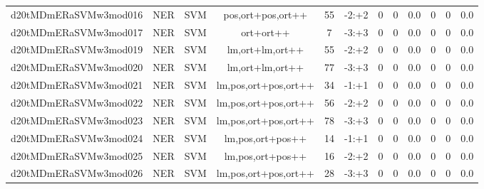 \documentclass[a4paper]{article}
\begin{document}
\begin{landscape}
\begin{center}
\begin{tabular}{ |c|c|c|c|c|c|c|c|c|c|c|c|}
 
 	
 	\small{ d20tMDmERaSVMw3mod016 } & \small{ NER} & \small{  SVM }  & pos,ort+pos,ort++  &  55 &  \small{  -2:+2 }  &  0 & 0 & 0.0  &  0 & 0 & 0.0 \\
 	

 
 	
 	\small{ d20tMDmERaSVMw3mod017 } & \small{ NER} & \small{  SVM }  & ort+ort++  &  7 &  \small{  -3:+3 }  &  0 & 0 & 0.0  &  0 & 0 & 0.0 \\
 	

 
 	
 	\small{ d20tMDmERaSVMw3mod019 } & \small{ NER} & \small{  SVM }  & lm,ort+lm,ort++  &  55 &  \small{  -2:+2 }  &  0 & 0 & 0.0  &  0 & 0 & 0.0 \\
 	

 
 	
 	\small{ d20tMDmERaSVMw3mod020 } & \small{ NER} & \small{  SVM }  & lm,ort+lm,ort++  &  77 &  \small{  -3:+3 }  &  0 & 0 & 0.0  &  0 & 0 & 0.0 \\
 	

 
 	
 	\small{ d20tMDmERaSVMw3mod021 } & \small{ NER} & \small{  SVM }  & lm,pos,ort+pos,ort++  &  34 &  \small{  -1:+1 }  &  0 & 0 & 0.0  &  0 & 0 & 0.0 \\
 	

 
 	
 	\small{ d20tMDmERaSVMw3mod022 } & \small{ NER} & \small{  SVM }  & lm,pos,ort+pos,ort++  &  56 &  \small{  -2:+2 }  &  0 & 0 & 0.0  &  0 & 0 & 0.0 \\
 	

 
 	
 	\small{ d20tMDmERaSVMw3mod023 } & \small{ NER} & \small{  SVM }  & lm,pos,ort+pos,ort++  &  78 &  \small{  -3:+3 }  &  0 & 0 & 0.0  &  0 & 0 & 0.0 \\
 	

 
 	
 	\small{ d20tMDmERaSVMw3mod024 } & \small{ NER} & \small{  SVM }  & lm,pos,ort+pos++  &  14 &  \small{  -1:+1 }  &  0 & 0 & 0.0  &  0 & 0 & 0.0 \\
 	

 
 	
 	\small{ d20tMDmERaSVMw3mod025 } & \small{ NER} & \small{  SVM }  & lm,pos,ort+pos++  &  16 &  \small{  -2:+2 }  &  0 & 0 & 0.0  &  0 & 0 & 0.0 \\
 	

 
 	
 	\small{ d20tMDmERaSVMw3mod026 } & \small{ NER} & \small{  SVM }  & lm,pos,ort+pos,ort++  &  28 &  \small{  -3:+3 }  &  0 & 0 & 0.0  &  0 & 0 & 0.0 \\
 	


\end{tabular}
\end{center}
\end{landscape}
\end{document}
